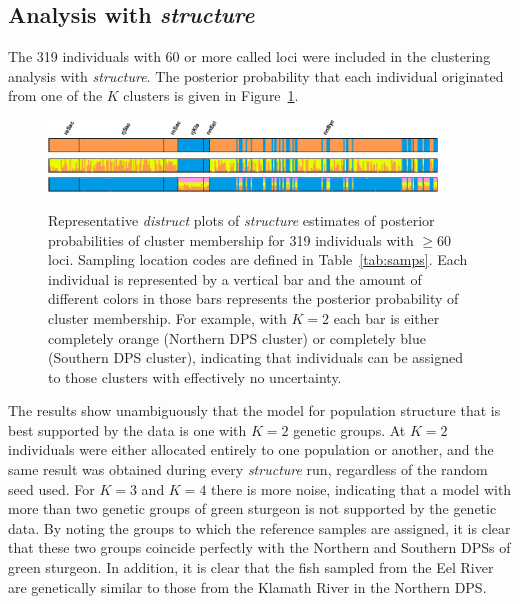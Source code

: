 \subsection{Analysis with {\em structure}}
The 319 individuals with 60 or more called loci were included in the clustering analysis with {\em structure}. 
The posterior probability that each 
individual originated from one of the $K$ clusters is given in Figure~\ref{fig:distruct}. 
\begin{figure}
\includegraphics[width = 0.92\textwidth]{inputs/BB_ds_Clumped_TopLabel_k002r001.pdf}~ \\
\includegraphics[width = 0.92\textwidth]{inputs/BB_ds_Clumped_NoLabel_k003r001.pdf}~ \\
\includegraphics[width = 0.92\textwidth]{inputs/BB_ds_Clumped_NoLabel_k004r001.pdf}~
\caption{ Representative {\em distruct} \protect\citep{rosenberg2004distruct} plots of {\em structure} estimates 
of posterior probabilities of cluster membership for 319 individuals with $\geq 60$ loci. Sampling location 
codes are defined in Table~\ref{tab:samps}. Each individual is represented by a vertical bar and the amount of different colors in those
bars represents the posterior probability of cluster membership. For example, with $K=2$ each bar is either completely orange (Northern 
DPS cluster) or completely blue (Southern DPS cluster), indicating that individuals can be assigned to those clusters with effectively 
no uncertainty. \label{fig:distruct}}
\end{figure}
The results show unambiguously that the model for population structure that is best supported by the 
data is one with $K = 2$ genetic groups. At $K=2$ individuals were either allocated entirely to
one population or another, and the same result was obtained during every {\em structure} run,
regardless of the random seed used. For $K=3$ and $K=4$ there is more noise, 
indicating that a model with more than two genetic groups of green sturgeon 
is not supported by the genetic data. By noting the groups to which the reference samples are assigned, it is clear 
that these two groups coincide perfectly with the Northern and Southern DPSs of green sturgeon. In addition, it is 
clear that the fish sampled from the Eel River are genetically similar to those from the Klamath River in the Northern DPS.


